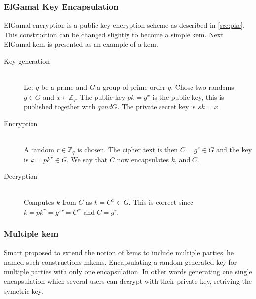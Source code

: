 \subsubsection{ElGamal Key Encapsulation \cite{elgamal-kem}}\label{subsubsec:elgamal}
ElGamal encryption is a public key encryption scheme as described in \ref{sec:pke}. This construction can be changed slightly to become a simple \gls{kem}. Next ElGamal \gls{kem} is presented as an example of a \gls{kem}.
\begin{description}
\item[Key generation]\hfill \\
Let $q$ be a prime and $G$ a group of prime order $q$. Chose two randoms $g \in G$ and $x \in \mathbb{Z}_q$. The public key $pk = g^x$ is the public key, this is published together with $q and G$. The private secret key is $sk = x$ 
\item[Encryption]\hfill \\
A random $r \in \mathbb{Z}_q$ is chosen. The cipher text is then $C = g^r \in G$ and the key is $k = pk^r \in G$. We say that $C$ now encapsulates $k$, and $C$.
\item[Decryption]\hfill \\
Computes $k$ from $C$ as $k = C^x \in G$. This is correct since \\$k = pk^r = g^{xr} = C^x$ and $ C = g^r$.
\end{description}




\subsubsection{Multiple \gls{kem}}\label{mkem}
Smart \cite{mkem} proposed to extend the notion of \glspl{kem} to include multiple parties, he named such constructions m\Glspl{kem}. Encapsulating a random generated key for multiple parties with only one encapsulation. In other words generating one single encapsulation which several users can decrypt with their private key, retriving the symetric key.




